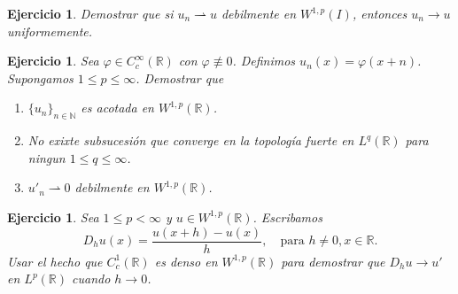 \documentclass{article}
\newcounter{ejer}
\newtheorem{ejercicio}[ejer]{Ejercicio}}
\newcommand{\rr}{\mathbb{R}}
\newcommand{\nn}{\mathbb{N}}
\begin{document}
\begin{ejercicio} Demostrar que si $u_n\rightharpoonup u$ debilmente en 
 $W^{1,p}(I)$, entonces $u_n\to u$ uniformemente.
\end{ejercicio}


\begin{ejercicio}  Sea $\varphi\in C_c^{\infty}(\rr)$ con $\varphi\not\equiv 0$. Definimos $u_n(x)=\varphi(x+n)$. Supongamos $1\leq p\leq \infty$. Demostrar que
 \begin{enumerate}
  \item $\{u_n\}_{n\in\nn}$ es acotada en $W^{1,p}(\rr)$.
  \item No exixte subsucesión que converge en la topología fuerte en  $L^q(\rr)$ para ningun  $1\leq q\leq \infty$.
   \item $ u'_{n} \rightharpoonup 0$ debilmente en $W^{1,p}(\rr)$.
 \end{enumerate}
\end{ejercicio}

\begin{ejercicio} Sea $1\leq p<\infty$ y $u\in W^{1,p}(\rr)$. Escribamos
\[D_hu(x)=\frac{u(x+h)-u(x)}{h},\quad\text{para } h\neq 0, x\in\rr.\]
Usar el hecho que $C_c^1(\rr)$ es denso en $W^{1,p}(\rr)$ para demostrar que $D_hu\to u'$ en $L^p(\rr)$ cuando $h\to 0$.
\end{ejercicio}
\end{document}
